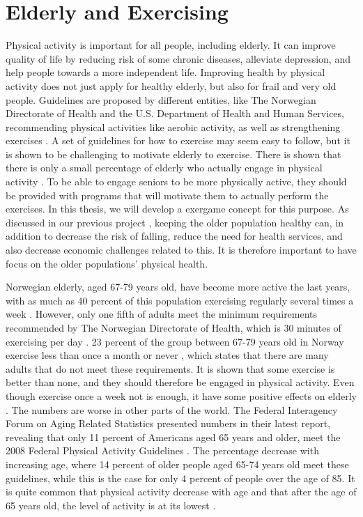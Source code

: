 \section{Elderly and Exercising}
\label{sec:exercisebehaviour}
Physical activity is important for all people, including elderly. It can improve quality of life by reducing risk of some chronic diseases, alleviate depression, and help people towards a more independent life. Improving health by physical activity does not just apply for healthy elderly, but also for frail and very old people. Guidelines are proposed by different entities, like The Norwegian Directorate of Health and the U.S. Department of Health and Human Services, recommending physical activities like aerobic activity, as well as strengthening exercises \cite{aktivitetsbok} \cite{guidelines}. A set of guidelines for how to exercise may seem easy to follow, but it is shown to be challenging to motivate elderly to exercise. There is shown that there is only a small percentage of elderly who actually engage in physical activity \cite{olderamericans}. To be able to engage seniors to be more physically active, they should be provided with programs that will motivate them to actually perform the exercises. In this thesis, we will develop a exergame concept for this purpose. As discussed in our previous project \cite{project}, keeping the older population healthy can, in addition to decrease the risk of falling, reduce the need for health services, and also decrease economic challenges related to this. It is therefore important to have focus on the older populations' physical health. 

Norwegian elderly, aged  67-79 years old, have become more active the last years, with as much as 40 percent of this population exercising regularly several times a week \cite{statisticsnorway}. However, only one fifth of adults meet the minimum requirements recommended by The Norwegian Directorate of Health, which is 30 minutes of exercising per day \cite{statistikknorge12}. 23 percent of the group between 67-79 years old in Norway exercise less than once a month or never \cite{statisticsnorway}, which states that there are many adults that do not meet these requirements. It is shown that some exercise is better than none, and they should therefore be engaged in physical activity. Even though exercise once a week not is enough, it have some positive effects on elderly \cite{gruppetrening-trheim}. The numbers are worse in other parts of the world. The Federal Interagency Forum on Aging Related Statistics \cite{olderamericans} presented numbers in their latest report, revealing that only 11 percent of Americans aged 65 years and older, meet the 2008 Federal Physical Activity Guidelines \cite{guidelines}. The percentage decrease with increasing age, where 14 percent of older people aged 65-74 years old meet these guidelines, while this is the case for only 4 percent of people over the age of 85. It is quite common that physical activity decrease with age and that after the age of 65 years old, the level of activity is at its lowest \cite{schutzer}. 
 
